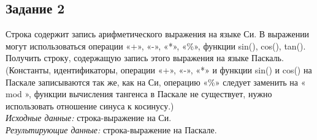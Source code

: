 \documentclass[a4paper,14pt]{extarticle}
\begin{document}
\subsection{Задание 2}
Строка содержит запись арифметического выражения на языке Си. В выражении могут использоваться операции «+», «-», «*», «\%», функции sin(), cos(), tan(). Получить строку, содержащую запись этого выражения на языке Паскаль. (Константы, идентификаторы, операции «+», «-», «*» и функции sin() и cos() на Паскале записываются так же, как на Си, операцию «\%» следует заменить на « mod », функции вычисления тангенса в Паскале не существует, нужно использовать отношение синуса к косинусу.)\\
\textit{Исходные данные:} строка-выражение на Си.\\
\textit{Результирующие данные:} строка-выражение на Паскале.\\
\end{document}
